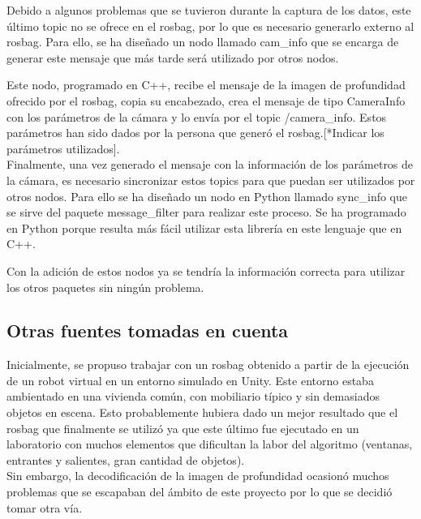 Debido a algunos problemas que se tuvieron durante la captura de los datos, este último topic no se ofrece en el rosbag, por lo que es necesario generarlo externo al rosbag. Para ello, se ha diseñado un nodo llamado cam\_info que se encarga de generar este mensaje que más tarde será utilizado por otros nodos.\\


Este nodo, programado en C++, recibe el mensaje de la imagen de profundidad ofrecido por el rosbag, copia su encabezado, crea el mensaje de tipo CameraInfo con los parámetros de la cámara y lo envía por el topic /camera\_info. Estos parámetros han sido dados por la persona que generó el rosbag.[*Indicar los parámetros utilizados].\\

Finalmente, una vez generado el mensaje con la información de los parámetros de la cámara, es necesario sincronizar estos topics para que puedan ser utilizados por otros nodos. Para ello se ha diseñado un nodo en Python llamado sync\_info que se sirve del paquete message\_filter para realizar este proceso. Se ha programado en Python porque resulta más fácil utilizar esta librería en este lenguaje que en C++.\\


Con la adición de estos nodos ya se tendría la información correcta para utilizar los otros paquetes sin ningún problema.\\

\subsection{Otras fuentes tomadas en cuenta}

Inicialmente, se propuso trabajar con un rosbag obtenido a partir de la ejecución de un robot virtual en un entorno simulado en Unity. Este entorno estaba ambientado en una vivienda común, con mobiliario típico y sin demasiados objetos en escena. Esto probablemente hubiera dado un mejor resultado que el rosbag que finalmente se utilizó ya que este último fue ejecutado en un laboratorio con muchos elementos que dificultan la labor del algoritmo (ventanas, entrantes y salientes, gran cantidad de objetos).\\

Sin embargo, la decodificación de la imagen de profundidad ocasionó muchos problemas que se escapaban del ámbito de este proyecto por lo que se decidió tomar otra vía.\\

